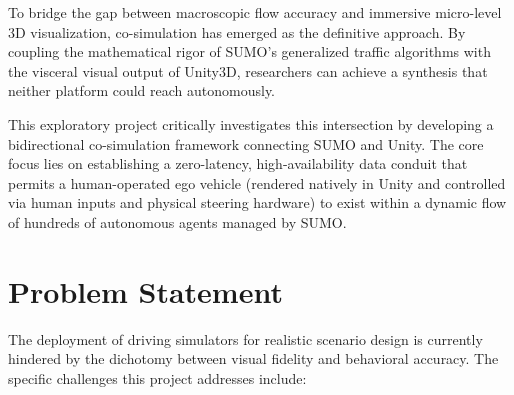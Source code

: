 \begin{insightbox}
To bridge the gap between macroscopic flow accuracy and immersive micro-level 3D visualization, co-simulation has emerged as the definitive approach. By coupling the mathematical rigor of SUMO's generalized traffic algorithms with the visceral visual output of Unity3D, researchers can achieve a synthesis that neither platform could reach autonomously.
\end{insightbox}

This exploratory project critically investigates this intersection by developing a bidirectional co-simulation framework connecting SUMO and Unity. The core focus lies on establishing a zero-latency, high-availability data conduit that permits a human-operated ego vehicle (rendered natively in Unity and controlled via human inputs and physical steering hardware) to exist within a dynamic flow of hundreds of autonomous agents managed by SUMO. 

\section{Problem Statement}

The deployment of driving simulators for realistic scenario design is currently hindered by the dichotomy between visual fidelity and behavioral accuracy. The specific challenges this project addresses include:

